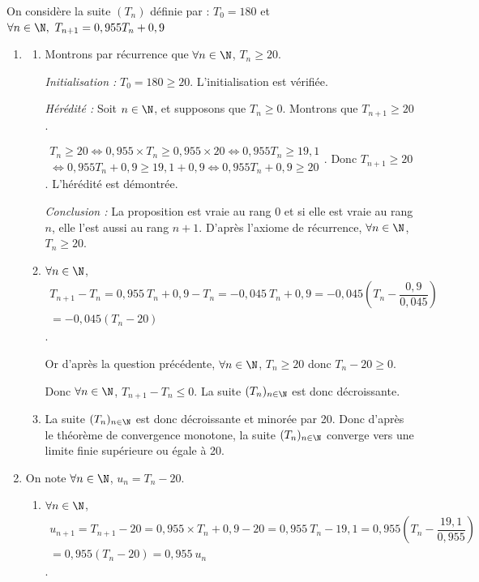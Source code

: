 \bigskip

On considère la suite $\left(T_n\right)$ définie par : $T_0 = 180$ et $\forall n \in \N,~T_{n+1} = 0,955T_n + 0,9$

\begin{enumerate}
	\item 
	\begin{enumerate}
		\item Montrons par récurrence que $\forall n \in \N$, $T_n \geqslant20$.

		\textit{Initialisation :} $T_0=180\geqslant 20$. L'initialisation est vérifiée.

		\textit{Hérédité :} Soit  $n \in \N$, et supposons que $T_n \geqslant 0$. Montrons que $T_{n+1}\geqslant 20$.

$\begin{gathered}T_n \geqslant 20 \iff 0,955 \times T_n\geqslant 0,955\times 20\iff 0,955 T_n\geqslant 19,1 \\
		\iff 0,955 T_n + 0,9 \geqslant 19,1+0,9 \iff 0,955 T_n + 0,9 \geqslant 20\end{gathered}$. Donc $T_{n+1}\geqslant 20$. L'hérédité est démontrée.

\textit{Conclusion : }  La proposition est vraie au rang $0$ et si elle est vraie au rang $n$, elle l'est aussi au rang $n + 1$.	D'après l'axiome de récurrence, $\forall n \in \N$, $T_n\geqslant 20$.
		\item $\forall n \in \N$, $\begin{gathered}T_{n+1}- T_n= 0,955~T_n+ 0,9 - T_n = - 0,045~T_n+0,9=-0,045\left(T_n-\dfrac{0,9}{0,045}\right)\\
	=-0,045(T_n-20)\end{gathered}$.

Or d'après la question précédente, $\forall n \in \N$, $T_n\geqslant 20$ donc $T_n - 20 \geqslant 0$.

Donc $\forall n \in \N$, $T_{n+1}-T_n \leqslant0$. La suite $(T_n)_{n\in \N}$ est donc décroissante.
		\item La suite $(T_n)_{n\in \N}$ est donc décroissante et minorée par 20. Donc d'après le théorème de convergence monotone, la suite $(T_n)_{n\in \N}$ converge vers une limite finie supérieure ou égale à 20.
	\end{enumerate}
	\item On note $\forall n \in \N$, $u_n=T_n-20$.
	\begin{enumerate}
		\item $\forall n\in \N$, $\begin{gathered}u_{n+1}=T_{n+1}-20=0,955\times T_n+0,9-20=0,955~T_n-19,1=0,955\left(T_n-\dfrac{19,1}{0,955}\right)\\=0,955(T_n-20)=0,955~u_n\end{gathered}$.


\end{enumerate}
\end{enumerate}

